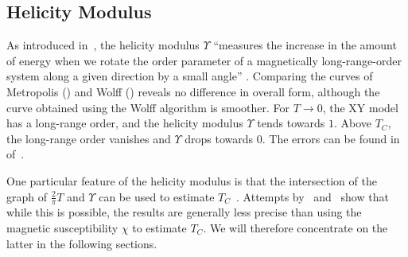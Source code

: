 	\subsection{Helicity Modulus}\label{sec:res:helicity:observable}
		As introduced in~, the helicity modulus $\Upsilon$ \enquote{measures the increase in the amount of energy when we rotate the order parameter of a magnetically long-range-order system along a given direction by a small angle} \citep[p. 1]{krueger}. Comparing the curves of Metropolis () and Wolff () reveals no difference in overall form, although the curve obtained using the Wolff algorithm is smoother. For $T \rightarrow 0$, the XY model has a long-range order, and the helicity modulus $\Upsilon$ tends towards $1$. Above $T_C$, the long-range order vanishes and $\Upsilon$ drops towards $0$. The errors can be found in~ of~.
		
		One particular feature of the helicity modulus is that the intersection of the graph of $\frac{2}{\pi} T$ and $\Upsilon$ can be used to estimate $T_C$~\citep{teitel_helicity}. Attempts by~\cite{teitel_helicity} and~\cite{olsson_helicity} show that while this is possible, the results are generally less precise than using the magnetic susceptibility $\chi$ to estimate $T_C$. We will therefore concentrate on the latter in the following sections.

	